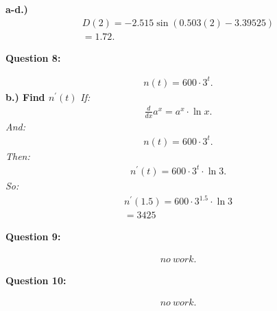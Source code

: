 \documentclass{report}
\begin{document}
    \bigbreak \noindent 
    \textbf{a-d.)}
    \begin{align*}
      D(2) =  -2.515\sin{(0.503(2)-3.39525)}\\ 
      =  1.72
    .\end{align*}

    \bigbreak \noindent \bigbreak \noindent 
    \begin{Large}
        \textbf{Question 8:}
    \end{Large}
    \bigbreak \noindent 
    \bigbreak \noindent 
    \begin{align*}
      n(t) = 600 \cdot 3^{t}
    .\end{align*}
    \bigbreak \noindent 
    \textbf{b.) Find $n^{\prime}(t)$}
    \bigbreak \noindent 
    \textit{If:}
    \begin{align*}
      \frac{d}{dx} a^{x} = a^{x}\cdot \ln{x}
    .\end{align*}
    \bigbreak \noindent 
    \textit{And:}
    \begin{align*}
      n(t) = 600\cdot 3^{t}
    .\end{align*}
    \bigbreak \noindent 
    \textit{Then:}
    \begin{align*}
      n^{\prime}(t) = 600 \cdot 3^{t} \cdot \ln{3}
    .\end{align*}
    \bigbreak \noindent
    \textit{So:}
    \begin{align*}
      n^{\prime}(1.5) = 600 \cdot 3^{1.5} \cdot \ln{3} \\ 
      =3425 
    \end{align*}

    \bigbreak \noindent \bigbreak \noindent 
    \begin{Large}
        \textbf{Question 9:}
    \end{Large}
    \bigbreak \noindent 
    \bigbreak \noindent 
    \begin{align*}
      no\ work
    .\end{align*}

    \bigbreak \noindent \bigbreak \noindent 
    \begin{Large}
        \textbf{Question 10:}
    \end{Large}
    \bigbreak \noindent 
    \bigbreak \noindent 
    \begin{align*}
      no\ work
    .\end{align*}


    
\end{document}
